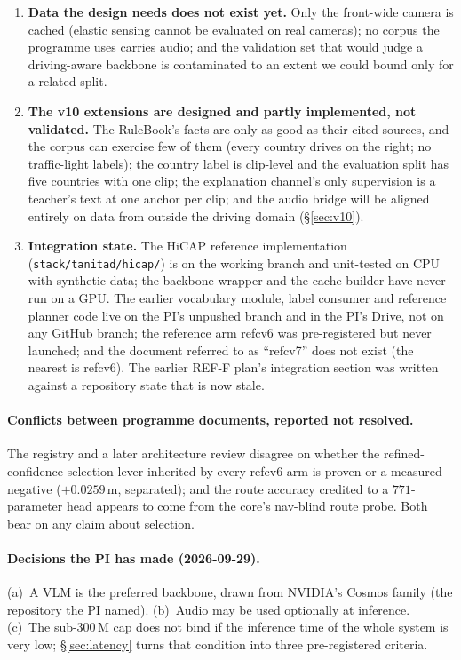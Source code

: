 \begin{enumerate}
\item \textbf{Data the design needs does not exist yet.} Only the front-wide camera is cached (elastic sensing cannot be evaluated on real cameras); no corpus the programme uses carries audio; and the validation set that would judge a driving-aware backbone is contaminated to an extent we could bound only for a related split.
\item \textbf{The v10 extensions are designed and partly implemented, not validated.} The RuleBook's facts are only as good as their cited sources, and the corpus can exercise few of them (every country drives on the right; no traffic-light labels); the country label is clip-level and the evaluation split has five countries with one clip; the explanation channel's only supervision is a teacher's text at one anchor per clip; and the audio bridge will be aligned entirely on data from outside the driving domain (\S\ref{sec:v10}).
\item \textbf{Integration state.} The HiCAP reference implementation (\texttt{stack/tanitad/hicap/}) is on the working branch and unit-tested on CPU with synthetic data; the backbone wrapper and the cache builder have never run on a GPU. The earlier vocabulary module, label consumer and reference planner code live on the PI's unpushed branch and in the PI's Drive, not on any GitHub branch; the reference arm refcv6 was pre-registered but never launched; and the document referred to as ``refcv7'' does not exist (the nearest is refcv6). The earlier REF-F plan's integration section was written against a repository state that is now stale.
\end{enumerate}

\paragraph{Conflicts between programme documents, reported not resolved.}
The registry and a later architecture review disagree on whether the refined-confidence selection lever inherited by every refcv6 arm is proven or a measured negative ($+0.0259$\,m, separated)\evI; and the route accuracy credited to a $771$-parameter head appears to come from the core's nav-blind route probe\evI. Both bear on any claim about selection.

\paragraph{Decisions the PI has made (2026-09-29).}
(a)~A VLM is the preferred backbone, drawn from NVIDIA's Cosmos family (the repository the PI named). (b)~Audio may be used optionally at inference. (c)~The sub-300\,M cap does not bind if the inference time of the whole system is very low; \S\ref{sec:latency} turns that condition into three pre-registered criteria.

